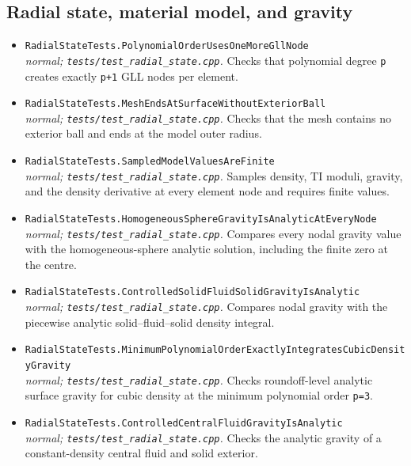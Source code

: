 \small
\subsection*{Radial state, material model, and gravity}
\begin{itemize}[leftmargin=1.4em,itemsep=0.35em]
\item {\footnotesize\texttt{RadialStateTests.PolynomialOrderUsesOneMoreGllNode}}\\
\emph{normal; \texttt{tests/test\_radial\_state.cpp}.} Checks that polynomial degree \texttt{p} creates exactly \texttt{p+1} GLL nodes per element.
\item {\footnotesize\texttt{RadialStateTests.MeshEndsAtSurfaceWithoutExteriorBall}}\\
\emph{normal; \texttt{tests/test\_radial\_state.cpp}.} Checks that the mesh contains no exterior ball and ends at the model outer radius.
\item {\footnotesize\texttt{RadialStateTests.SampledModelValuesAreFinite}}\\
\emph{normal; \texttt{tests/test\_radial\_state.cpp}.} Samples density, TI moduli, gravity, and the density derivative at every element node and requires finite values.
\item {\footnotesize\texttt{RadialStateTests.HomogeneousSphereGravityIsAnalyticAtEveryNode}}\\
\emph{normal; \texttt{tests/test\_radial\_state.cpp}.} Compares every nodal gravity value with the homogeneous-sphere analytic solution, including the finite zero at the centre.
\item {\footnotesize\texttt{RadialStateTests.ControlledSolidFluidSolidGravityIsAnalytic}}\\
\emph{normal; \texttt{tests/test\_radial\_state.cpp}.} Compares nodal gravity with the piecewise analytic solid--fluid--solid density integral.
\item {\footnotesize\texttt{RadialStateTests.MinimumPolynomialOrderExactlyIntegratesCubicDensityGravity}}\\
\emph{normal; \texttt{tests/test\_radial\_state.cpp}.} Checks roundoff-level analytic surface gravity for cubic density at the minimum polynomial order \texttt{p=3}.
\item {\footnotesize\texttt{RadialStateTests.ControlledCentralFluidGravityIsAnalytic}}\\
\emph{normal; \texttt{tests/test\_radial\_state.cpp}.} Checks the analytic gravity of a constant-density central fluid and solid exterior.

\end{itemize}
